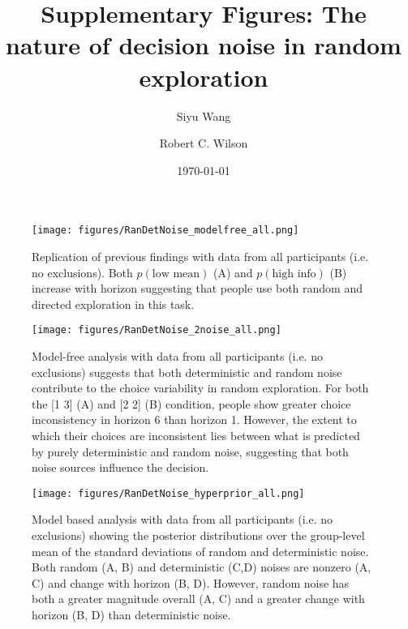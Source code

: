 \documentclass[12pt]{article}
\title{Supplementary Figures: The nature of decision noise in random exploration}
\author[1]{Siyu Wang}
\author[1,2]{Robert C. Wilson}
\affil[1]{Department of Psychology, University of Arizona, Tucson AZ USA}
\affil[2]{Cognitive Science Program, University of Arizona, Tucson AZ USA}
\date{\today}
\begin{document}
	\maketitle
	
	\newpage
	
	
	\begin{figure}[H]
		\begin{center}
			\texttt{[image: figures/RanDetNoise\_modelfree\_all.png]}
			\caption{Replication of previous findings with data from all participants (i.e. no exclusions). Both  $p(\mbox{low mean})$ (A) and $p(\mbox{high info})$ (B) increase with horizon suggesting that people use both random and directed exploration in this task.  }
			\label{fig:modelfree2}
		\end{center}
	\end{figure}

	\begin{figure}[H]
		\begin{center}
			\texttt{[image: figures/RanDetNoise\_2noise\_all.png]}
			\caption{Model-free analysis with data from all participants (i.e. no exclusions) suggests that both deterministic and random noise contribute to the choice variability in random exploration. For both the [1 3] (A) and [2 2] (B) condition, people show greater choice inconsistency in horizon 6 than horizon 1. However, the extent to which their choices are inconsistent lies between what is predicted by purely deterministic and random noise, suggesting that both noise sources influence the decision.}
			\label{fig:mf22}
		\end{center}
	\end{figure}
	\newpage
	\begin{figure}[H]
		\begin{center}
			\texttt{[image: figures/RanDetNoise\_hyperprior\_all.png]}
			\caption{Model based analysis with data from all participants (i.e. no exclusions) showing the posterior distributions over the group-level mean of the standard deviations of  random and deterministic noise. Both random (A, B) and deterministic (C,D) noises are nonzero (A, C) and change with horizon (B, D).  However, random noise has both a greater magnitude overall (A, C) and a greater change with horizon (B, D) than deterministic noise.}
			\label{fig:mb12}
		\end{center}
	\end{figure}
	
\end{document}

